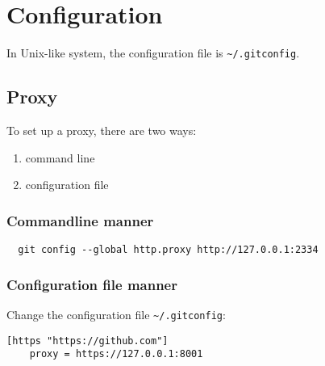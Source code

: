 
\chapter{Configuration}

In Unix-like system, the configuration file is \verb|~/.gitconfig|.


\section{Proxy}

To set up a proxy, there are two ways:
\begin{enumerate}
\item command line
\item configuration file
\end{enumerate}


\subsection{Commandline manner}

\lstset{language=Sh}
\begin{lstlisting}
  git config --global http.proxy http://127.0.0.1:2334
\end{lstlisting}

\subsection{Configuration file manner}

Change the configuration file \verb|~/.gitconfig|:
\begin{verbatim}
[https "https://github.com"]
	proxy = https://127.0.0.1:8001
\end{verbatim}